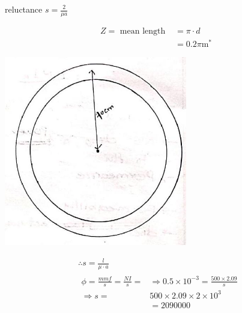 \documentclass[12pt, a4paper]{article}
\newcommand{\figwidth}{8cm}
\begin{document}
reluctance $s=\frac{2}{\mu a}$

$$
	\begin{aligned}
		Z=\text { mean length } & =\pi \cdot d            \\
		                        & =0.2 \pi \mathrm{m}^{*}
	\end{aligned}
$$

\begin{center}
	\includegraphics[max width=\figwidth]{2024_06_15_ae1c13e212c06c234cc4g-04}
\end{center}

$$
	\begin{aligned}
		 & \therefore s=\frac{l}{\mu \cdot a}                                                             \\
		 & \begin{aligned}
			   \phi=\frac{m m f}{s}=\frac{N I}{s}= & \Rightarrow 0.5 \times 10^{-3}=\frac{500 \times 2.09}{s} \\
			   \Rightarrow s=                      & 500 \times 2.09 \times 2 \times 10^{3}                   \\
			                                       & =2090000
		   \end{aligned}
	\end{aligned}
$$
\end{document}
